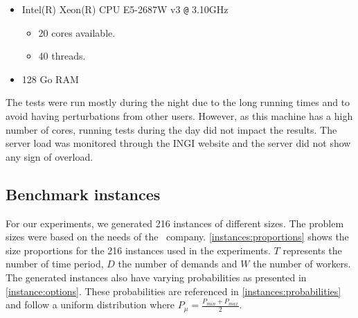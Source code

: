 \documentclass[../../thesis.tex]{subfiles}
\begin{document}
\begin{itemize}
  \item Intel(R) Xeon(R) CPU E5-2687W v3 \verb+@+ 3.10GHz 
    \begin{itemize}
      \item 20 cores available.
      \item 40 threads.
    \end{itemize}
  \item 128 Go RAM
\end{itemize}

The tests were run mostly during the night due to the long running times and to avoid having 
perturbations from other users. However, as this machine has a high number of cores, running tests 
during the day did not impact the results. 
The server load was monitored through the INGI website \cite{jabba:monitoring} and the server did not show any sign of overload.

\subsection{Benchmark instances}

For our experiments, we generated 216 instances of different sizes. The problem sizes were based on the needs of the \vone\ company.
\autoref{instances:proportions} shows the size proportions for the 216 instances used in the experiments. $T$ represents the number of time period, $D$ the number of demands and $W$ the number of workers. The generated instances also have varying probabilities as presented in \autoref{instance:options}. These probabilities are referenced in \autoref{instances:probabilities} and follow a uniform distribution where $P_{\mu} = \frac{P_{min} + P_{max}}{2}$.
\end{document}
